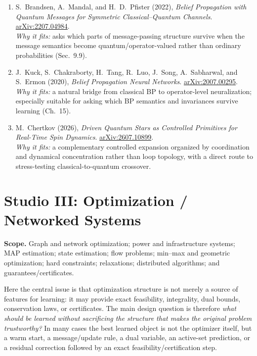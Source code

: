 \documentclass[11pt]{article}
\newcommand{\studio}[1]{\section{#1}}
\begin{document}
\begin{enumerate}[leftmargin=1.7em,itemsep=5pt]
    \item S.~Brandsen, A.~Mandal, and H.~D.~Pfister (2022), \emph{Belief Propagation with Quantum Messages for Symmetric Classical--Quantum Channels}. \href{https://arxiv.org/abs/2207.04984}{arXiv:2207.04984}.\\
    \textcolor{UAgray}{\emph{Why it fits:} asks which parts of message-passing structure survive when the message semantics become quantum/operator-valued rather than ordinary probabilities (Sec.~9.9).}

    \item J.~Kuck, S.~Chakraborty, H.~Tang, R.~Luo, J.~Song, A.~Sabharwal, and S.~Ermon (2020), \emph{Belief Propagation Neural Networks}. \href{https://arxiv.org/abs/2007.00295}{arXiv:2007.00295}.\\
    \textcolor{UAgray}{\emph{Why it fits:} a natural bridge from classical BP to operator-level neuralization; especially suitable for asking which BP semantics and invariances survive learning (Ch.~15).}

    \item M.~Chertkov (2026), \emph{Driven Quantum Stars as Controlled Primitives for Real-Time Spin Dynamics}. \href{https://arxiv.org/abs/2607.10899}{arXiv:2607.10899}.\\
    \textcolor{UAgray}{\emph{Why it fits:} a complementary controlled expansion organized by coordination and dynamical concentration rather than loop topology, with a direct route to stress-testing classical-to-quantum crossover.}
\end{enumerate}


\studio{Studio III: Optimization / Networked Systems}

\textbf{Scope.} Graph and network optimization; power and infrastructure systems; MAP estimation; state estimation; flow problems; min--max and geometric optimization; hard constraints; relaxations; distributed algorithms; and guarantees/certificates.

Here the central issue is that optimization structure is not merely a source of features for learning: it may provide exact feasibility, integrality, dual bounds, conservation laws, or certificates. The main design question is therefore \emph{what should be learned without sacrificing the structure that makes the original problem trustworthy?} In many cases the best learned object is not the optimizer itself, but a warm start, a message/update rule, a dual variable, an active-set prediction, or a residual correction followed by an exact feasibility/certification step.
\end{document}
